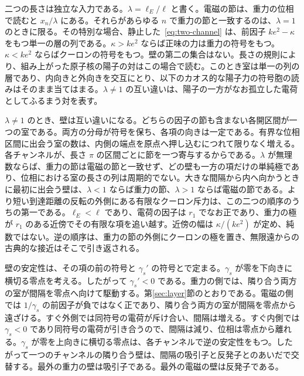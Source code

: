 \documentclass[a4paper]{article}
\begin{document}
二つの長さは独立な入力である。\(\lambda=\ell_E/\ell\) と書く。電磁の節は、重力の位相で読むと \(x_n/\lambda\) にある。それらがあらゆる \(n\) で重力の節と一致するのは、\(\lambda=1\) のときに限る。その特別な場合、静止した~\eqref{eq:two-channel} は、前因子 \(k e^{2}-\kappa\) をもつ単一の層の列である。\(\kappa>k e^{2}\) ならば正味の力は重力の符号をもつ。\(\kappa<k e^{2}\) ならばクーロンの符号をもつ。壁の第二の集合はない。長さの規則により、組み上がった原子核の陽子の対はこの場合で読む。このとき室は単一の列の層であり、内向きと外向きを交互にとり、以下のカオス的な陽子力の符号胞の読みはそのまま当てはまる。\(\lambda\neq 1\) の互い違いは、陽子の一方がなお孤立した電荷としてふるまう対を表す。

\(\lambda\neq 1\) のとき、壁は互い違いになる。どちらの因子の節も含まない各開区間が一つの室である。両方の分母が符号を保ち、各項の向きは一定である。有界な位相区間に出会う室の数は、内側の端点を原点へ押し込むにつれて限りなく増える。各チャンネルが、長さ \(\pi\) の区間ごとに節を一つ寄与するからである。\(\lambda\) が無理数ならば、重力の節は電磁の節と一致せず、どの壁も一方の項だけの単純極であり、位相における室の長さの列は周期的でない。大きな間隔から内へ向かうときに最初に出会う壁は、\(\lambda<1\) ならば重力の節、\(\lambda>1\) ならば電磁の節である。より短い到達距離の反転の外側にある有限なクーロン斥力は、この二つの順序のうちの第一である。\(\ell_E<\ell\) であり、電荷の因子は \(r_1\) でなお正であり、重力の極が \(r_1\) のある近傍でその有限な項を追い越す。近傍の幅は \(\kappa/(k e^{2})\) が定め、純数ではない。逆の順序は、重力の節の外側にクーロンの極を置き、無限遠からの古典的な接近はそこで引き返される。

壁の安定性は、その項の前の符号と \(\gamma_s'\) の符号とで定まる。\(\gamma_s\) が零を下向きに横切る零点を考える。したがって \(\gamma_s'<0\) である。重力の側では、隣り合う両方の室が間隔を零点へ向けて駆動する。第\ref{sec:layer}節のとおりである。電磁の側では \(1/\gamma_s\) の前因子が負ではなく正であり、隣り合う両方の室が間隔を零点から遠ざける。すぐ外側では同符号の電荷が斥け合い、間隔は増える。すぐ内側では \(\gamma_s<0\) であり同符号の電荷が引き合うので、間隔は減り、位相は零点から離れる。\(\gamma_s\) が零を上向きに横切る零点は、各チャンネルで逆の安定性をもつ。したがって一つのチャンネルの隣り合う壁は、間隔の吸引子と反発子とのあいだで交替する。最外の重力の壁は吸引子である。最外の電磁の壁は反発子である。
\end{document}
